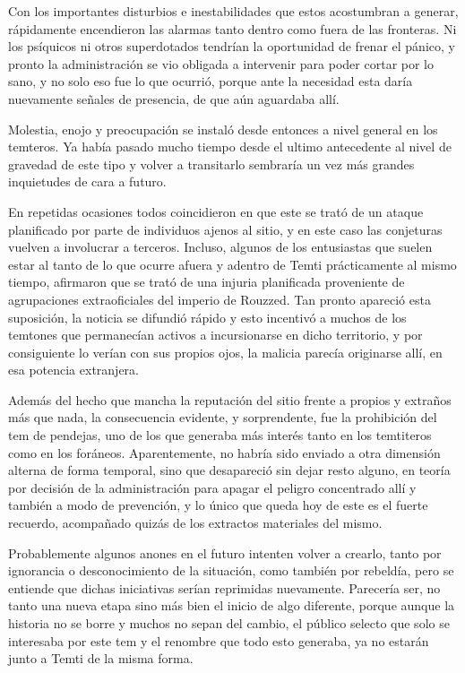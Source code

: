 \documentclass[
]{book}
\begin{document}
Con los importantes disturbios e inestabilidades que estos acostumbran a generar, rápidamente encendieron las alarmas tanto dentro como fuera de las fronteras. Ni los psíquicos ni otros superdotados tendrían la oportunidad de frenar el pánico, y pronto la administración se vio obligada a intervenir para poder cortar por lo sano, y no solo eso fue lo que ocurrió, porque ante la necesidad esta daría nuevamente señales de presencia, de que aún aguardaba allí.

Molestia, enojo y preocupación se instaló desde entonces a nivel general en los temteros. Ya había pasado mucho tiempo desde el ultimo antecedente al nivel de gravedad de este tipo y volver a transitarlo sembraría un vez más grandes inquietudes de cara a futuro.

En repetidas ocasiones todos coincidieron en que este se trató de un ataque planificado por parte de individuos ajenos al sitio, y en este caso las conjeturas vuelven a involucrar a terceros. Incluso, algunos de los entusiastas que suelen estar al tanto de lo que ocurre afuera y adentro de Temti prácticamente al mismo tiempo, afirmaron que se trató de una injuria planificada proveniente de agrupaciones extraoficiales del imperio de Rouzzed. Tan pronto apareció esta suposición, la noticia se difundió rápido y esto incentivó a muchos de los temtones que permanecían activos a incursionarse en dicho territorio, y por consiguiente lo verían con sus propios ojos, la malicia parecía originarse allí, en esa potencia extranjera.

Además del hecho que mancha la reputación del sitio frente a propios y extraños más que nada, la consecuencia evidente, y sorprendente, fue la prohibición del tem de pendejas, uno de los que generaba más interés tanto en los temtiteros como en los foráneos. Aparentemente, no habría sido enviado a otra dimensión alterna de forma temporal, sino que desapareció sin dejar resto alguno, en teoría por decisión de la administración para apagar el peligro concentrado allí y también a modo de prevención, y lo único que queda hoy de este es el fuerte recuerdo, acompañado quizás de los extractos materiales del mismo.

Probablemente algunos anones en el futuro intenten volver a crearlo, tanto por ignorancia o desconocimiento de la situación, como también por rebeldía, pero se entiende que dichas iniciativas serían reprimidas nuevamente. Parecería ser, no tanto una nueva etapa sino más bien el inicio de algo diferente, porque aunque la historia no se borre y muchos no sepan del cambio, el público selecto que solo se interesaba por este tem y el renombre que todo esto generaba, ya no estarán junto a Temti de la misma forma.
\end{document}
